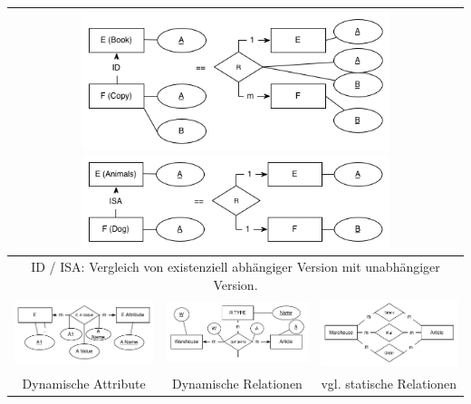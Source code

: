 \begin{tabular}{|c|c|c|}
\hline 
\multicolumn{3}{|c}{\includegraphics[width=9cm]{Design/f3}\includegraphics[width=9cm]{Design/f4}}\tabularnewline
\hline 
\multicolumn{3}{|c|}{ID / ISA: Vergleich von existenziell abhängiger Version mit unabhängiger
Version.}\tabularnewline
\hline 
\includegraphics[width=6cm]{Design/f5} & \includegraphics[width=6cm]{Design/f6} & \includegraphics[width=6cm]{Design/f7}\tabularnewline
\hline 
Dynamische Attribute & Dynamische Relationen & vgl. statische Relationen\tabularnewline
\hline 
\end{tabular}

